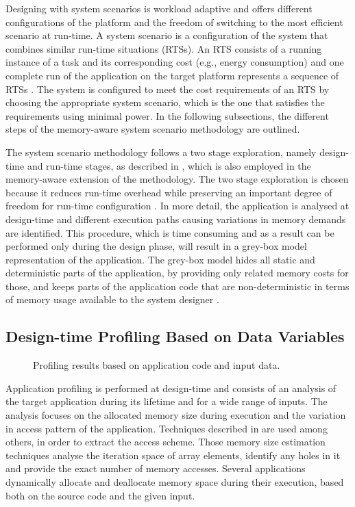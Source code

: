 \documentclass{acm_proc_article-sp}
\begin{document}
Designing with system scenarios is workload adaptive and offers different configurations of the platform and the freedom of switching to the most efficient scenario at run-time. A system scenario is a configuration of the system that combines similar run-time situations (RTSs). An RTS consists of a running instance of a task and its corresponding cost (e.g., energy consumption) and one complete run of the application on the target platform represents a sequence of RTSs \cite{Elena2010}. The system is configured to meet the cost requirements of an RTS by choosing the appropriate system scenario, which is the one that satisfies the requirements using minimal power. In the following subsections, the different steps of the memory-aware system scenario methodology are outlined. 

The system scenario methodology follows a two stage exploration, namely design-time and run-time stages, as described in \cite{Gheorghita2007}, which is also employed in the memory-aware extension of the methodology. The two stage exploration is chosen because it reduces run-time overhead while preserving an important degree of freedom for run-time configuration \cite{tcm}. In more detail, the application is analysed at design-time and different execution paths causing variations in memory demands are identified. This procedure, which is time consuming and as a result can be performed only during the design phase, will result in a grey-box model representation of the application. The grey-box model hides all static and deterministic parts of the application, by providing only related memory costs for those, and keeps parts of the application code that are non-deterministic in terms of memory usage available to the system designer \cite{graybox}. 


\subsection{Design-time Profiling Based on Data Variables}

\begin{figure}[!t]
\centering
\caption{Profiling results based on application code and input data.}
\label{fig:profiling}
\end{figure}



Application profiling is performed at design-time and consists of an analysis of the target application during its lifetime and for a wide range of inputs. The analysis focuses on the allocated memory size during execution and the variation in access pattern of the application. Techniques described in \cite{Ang13b} are used among others, in order to extract the access scheme. Those memory size estimation techniques analyse the iteration space of array elements, identify any holes in it and provide the exact number of memory accesses. Several applications dynamically allocate and deallocate memory space during their execution, based both on the source code and the given input. 
\end{document}
